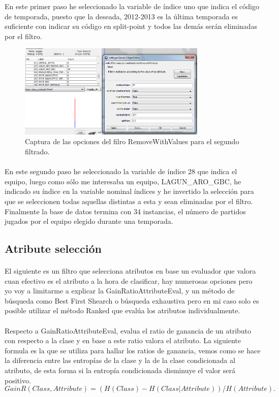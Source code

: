 \documentclass[es]{ifirak}
\begin{document}
En este primer paso he seleccionado la variable de índice uno que indica el código de temporada, puesto que la deseada, 2012-2013 es la última temporada es suficiente con indicar su código en split-point y todos las demás serán eliminadas por el filtro.

\begin{figure}[htbp]
\centering
\includegraphics[width=0.8\textwidth]{SegundoFiltro.png}
\caption{Captura de las opciones del filro RemoveWithValues para el segundo filtrado.}\label{figure}
\end{figure}

\paragraph{}
En este segundo paso he seleccionado la variable de índice 28 que indica el equipo, luego como sólo me interesaba un equipo, LAGUN\_{ARO}\_{GBC}, he indicado su índice en la variable nominal índices y he invertido la selección para que se seleccionen todas aquellas distintas a esta y sean eliminadas por el filtro.
Finalmente la base de datos termina con 34 instancias, el número de partidos jugados por el equipo elegido durante una temporada.

\subsection{Atribute selección}
\paragraph{}
El siguiente es un filtro que selecciona atributos en base un evaluador que valora cuan efectivo es  el atributo a la hora de clasificar, hay numerosas opciones pero yo voy a limitarme a explicar la GainRatioAttributeEval, y un método de búsqueda como Best First Shearch o búsqueda exhaustiva pero en mi caso solo es posible utilizar el método Ranked que evalúa los atributos individualmente.
\paragraph{}
Respecto a GainRatioAttributeEval, evalua el ratio de ganancia de un atributo con respecto a la clase y en base a este ratio valora el atributo. La siguiente formula es la que se utiliza para hallar los ratios de ganancia, vemos como se hace la diferencia entre las entropías de la clase y la de la clase condicionada al atributo, de esta forma si la entropía condicionada disminuye  el valor será positivo.
$$GainR(Class, Attribute) = (H(Class) - H(Class | Attribute)) / H(Attribute).$$
\end{document}
